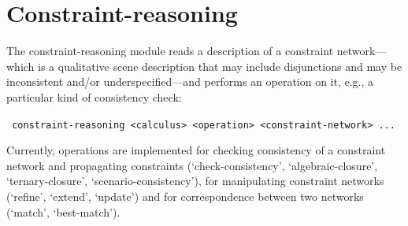 \documentclass[headsepline]{scrreprt}
\theoremstyle{definition}
\newcommand{\engine}{SparQ}
\begin{document}

\section{Constraint-reasoning}\label{sec:constraint-reasoning}


The constraint-reasoning module reads a description of a constraint
network---which is a
qualitative scene description that may include disjunctions and may be
inconsistent and/or underspecified---and performs an operation on it,
e.g., a particular kind of consistency check:
\begin{center}
{\verb= constraint-reasoning <calculus> <operation> <constraint-network> ... = }
\end{center}

Currently, operations are implemented for
checking consistency of a constraint network and propagating constraints
(`check-consistency', `algebraic-closure', `ternary-closure', `scenario-consistency'),
for manipulating constraint networks (`refine', `extend', `update') and
for correspondence between two networks (`match', `best-match').

\end{document}
